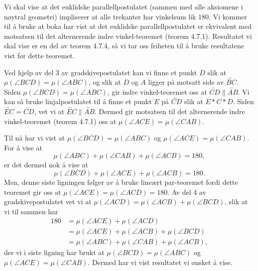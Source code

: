 \begin{oppgave}[4.7.6]
    Vi skal vise at det euklidske parallellpostulatet (sammen med alle aksiomene i nøytral geometri) impliserer at alle trekanter har vinkelsum lik $180$. 
    Vi kommer til å bruke at boka har vist at det euklidske parallellpostulatet er ekvivalent med motsatsen til det alternerende indre vinkel-teoremet (teorem 4.7.1).
    Resultatet vi skal vise er en del av teorem 4.7.4, så vi tar oss friheten til å bruke resultatene vist før dette teoremet. 

    Ved hjelp av del 3 av gradskivepostulatet kan vi finne et punkt $D$ slik at $\mu(\angle BCD)=\mu(\angle ABC)$, og slik at $D$ og $A$ ligger på motsatt side av $\overleftrightarrow{BC}$. 
    Siden $\mu(\angle BCD) = \mu(\angle ABC)$, gir indre vinkel-teoremet oss at $\overleftrightarrow{CD}\parallel \overleftrightarrow{AB}$. 
    Vi kan så bruke linjalpostulatet til å finne et punkt $E$ på $\overleftrightarrow{CD}$ slik at $E\ast C\ast D$. 
    Siden $\overleftrightarrow{EC}=\overleftrightarrow{CD}$, vet vi at $\overleftrightarrow{EC}\parallel \overleftrightarrow{AB}$. 
    Dermed gir motsatsen til det alternerende indre vinkel-teoremet (teorem 4.7.1) oss at $\mu(\angle ACE)=\mu(\angle CAB)$. 

    \begin{figure}[H]
        \centering
          
    \end{figure}

    Til nå har vi vist at $\mu(\angle BCD)=\mu(\angle ABC)$ og $\mu(\angle ACE)=\mu(\angle CAB)$. 
    For å vise at 
    $$\mu(\angle ABC)+\mu(\angle CAB)+\mu(\angle ACB)=180,$$
    er det dermed nok å vise at 
    $$\mu(\angle BCD)+\mu(\angle ACE)+\mu(\angle ACB)=180.$$
    Men, denne siste ligningen følger av å bruke lineært par-teoremet fordi dette teoremet gir oss at $\mu(\angle ACE)=\mu(\angle ACD)=180$. 
    Av del 4 av gradskivepostulatet vet vi at $\mu(\angle ACD)=\mu(\angle ACB)+\mu(\angle BCD)$, slik at vi til sammen har 
    \begin{align*}
        180 
        &= \mu(\angle ACE)+\mu(\angle ACD) \\
        &= \mu(\angle ACE)+\mu(\angle ACB)+\mu(\angle BCD) \\
        &= \mu(\angle ABC)+\mu(\angle CAB)+\mu(\angle ACB), 
    \end{align*}
    der vi i siste ligning har brukt at $\mu(\angle BCD)=\mu(\angle ABC)$ og $\mu(\angle ACE)=\mu(\angle CAB)$. 
    Dermed har vi vist resultatet vi ønsket å vise. 
\end{oppgave}

